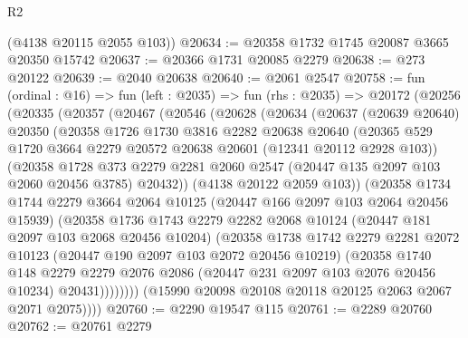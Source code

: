 \begin{lexlean}{R2}
\begin{coremodule}
      (@4138 @20115 @2055 @103))
@20634 := @20358 @1732 @1745 @20087 @3665 @20350 @15742
@20637 := @20366 @1731 @20085 @2279
@20638 := @273 @20122
@20639 := @2040 @20638
@20640 := @2061 @2547
@20758 := fun (ordinal : @16) =>
  fun (left : @2035) =>
  fun (rhs : @2035) =>
  @20172
    (@20256
      (@20335
        (@20357
          (@20467
            (@20546
              (@20628
                (@20634
                  (@20637
                    (@20639 @20640)
                    @20350
                    (@20358
                      @1726
                      @1730
                      @3816
                      @2282
                      @20638
                      @20640
                      (@20365
                        @529
                        @1720
                        @3664
                        @2279
                        @20572
                        @20638
                        @20601
                        (@12341 @20112 @2928 @103))
                      (@20358
                        @1728
                        @373
                        @2279
                        @2281
                        @2060
                        @2547
                        (@20447 @135 @2097 @103 @2060 @20456 @3785)
                        @20432))
                    (@4138 @20122 @2059 @103))
                  (@20358
                    @1734
                    @1744
                    @2279
                    @3664
                    @2064
                    @10125
                    (@20447 @166 @2097 @103 @2064 @20456 @15939)
                    (@20358
                      @1736
                      @1743
                      @2279
                      @2282
                      @2068
                      @10124
                      (@20447 @181 @2097 @103 @2068 @20456 @10204)
                      (@20358
                        @1738
                        @1742
                        @2279
                        @2281
                        @2072
                        @10123
                        (@20447 @190 @2097 @103 @2072 @20456 @10219)
                        (@20358
                          @1740
                          @148
                          @2279
                          @2279
                          @2076
                          @2086
                          (@20447 @231 @2097 @103 @2076 @20456 @10234)
                          @20431))))))))
          (@15990 @20098 @20108 @20118 @20125 @2063 @2067 @2071 @2075))))
@20760 := @2290 @19547 @115
@20761 := @2289 @20760
@20762 := @20761 @2279

\end{coremodule}
\end{lexlean}

